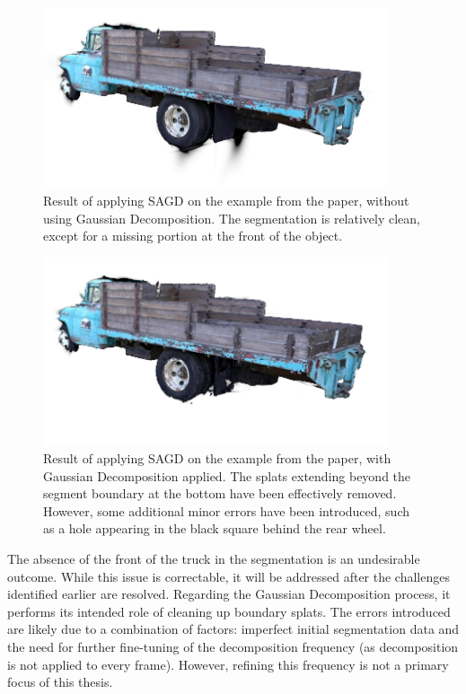 \documentclass[12pt]{article}
\begin{document}
\begin{figure}[h!]
	\centering
	\includegraphics[width=0.9\textwidth]{Images/nodecomp.png}
	\caption{Result of applying SAGD on the example from the paper, without using Gaussian Decomposition. The segmentation is relatively clean, except for a missing portion at the front of the object.}
	\label{fig:sagdwithout}
\end{figure}
\begin{figure}[h!]
	\centering
	\includegraphics[width=0.9\textwidth]{Images/withdecomp.png}
	\caption{Result of applying SAGD on the example from the paper, with Gaussian Decomposition applied. The splats extending beyond the segment boundary at the bottom have been effectively removed. However, some additional minor errors have been introduced, such as a hole appearing in the black square behind the rear wheel.}
	\label{fig:sagdwith}
\end{figure}
\FloatBarrier
\noindent
The absence of the front of the truck in the segmentation is an undesirable outcome. While this issue is correctable, it will be addressed after the challenges identified earlier are resolved. Regarding the Gaussian Decomposition process, it performs its intended role of cleaning up boundary splats. The errors introduced are likely due to a combination of factors: imperfect initial segmentation data and the need for further fine-tuning of the decomposition frequency (as decomposition is not applied to every frame). However, refining this frequency is not a primary focus of this thesis.
\end{document}
